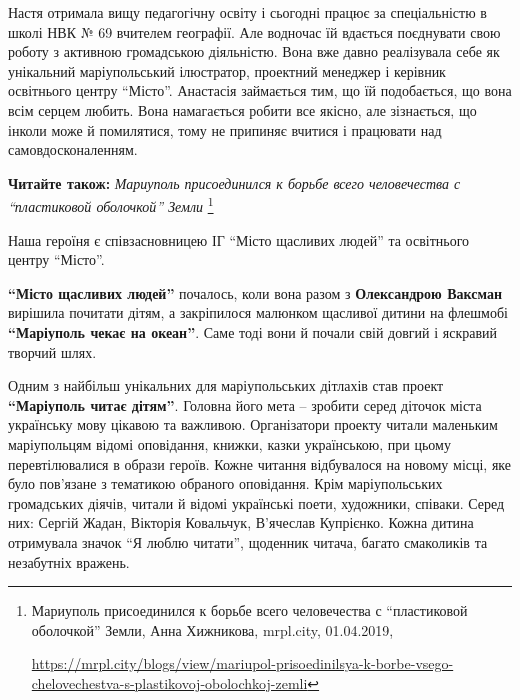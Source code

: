 
Настя отримала вищу педагогічну освіту і сьогодні працює за спеціальністю в
школі НВК № 69 вчителем географії. Але водночас їй вдається поєднувати свою
роботу з активною громадською діяльністю. Вона вже давно реалізувала себе як
унікальний маріупольський ілюстратор, проектний менеджер і керівник освітнього
центру \enquote{Місто}. Анастасія займається тим, що їй подобається, що вона всім
серцем любить. Вона намагається робити все якісно, але зізнається, що інколи
може й помилятися, тому не припиняє вчитися і працювати над самовдосконаленням.

\textbf{Читайте також:} \emph{Мариуполь присоединился к борьбе всего человечества с \enquote{пластиковой оболочкой} Земли}%
\footnote{Мариуполь присоединился к борьбе всего человечества с \enquote{пластиковой оболочкой} Земли, Анна Хижникова, %
mrpl.city, 01.04.2019, \par%
\url{https://mrpl.city/blogs/view/mariupol-prisoedinilsya-k-borbe-vsego-chelovechestva-s-plastikovoj-obolochkoj-zemli} }

Наша героїня є співзасновницею ІГ \enquote{Місто щасливих людей} та освітнього центру \enquote{Місто}.


\textbf{\enquote{Місто щасливих людей}} почалось, коли вона разом з \textbf{Олександрою Ваксман} вирішила
почитати дітям, а закріпилося малюнком щасливої дитини на флешмобі \textbf{\enquote{Маріуполь
чекає на океан}}. Саме тоді вони й почали свій довгий і яскравий творчий шлях.

Одним з найбільш унікальних для маріупольських дітлахів став проект \textbf{\enquote{Маріуполь
читає дітям}}. Головна його мета – зробити серед діточок міста українську мову
цікавою та важливою. Організатори проекту читали маленьким маріупольцям відомі
оповідання, книжки, казки українською, при цьому перевтілювалися в образи
героїв. Кожне читання відбувалося на новому місці, яке було пов'язане з
тематикою обраного оповідання. Крім маріупольських громадських діячів, читали й
відомі українські поети, художники, співаки. Серед них: Сергій Жадан, Вікторія
Ковальчук, В'ячеслав Купрієнко. Кожна дитина отримувала значок \enquote{Я люблю
читати}, щоденник читача, багато смаколиків та незабутніх вражень.


